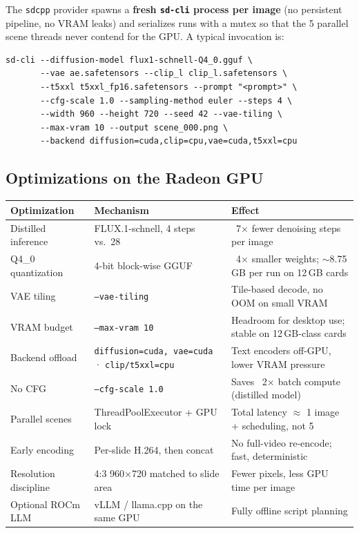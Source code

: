 \documentclass[UTF8,fontset=mac,a4paper,11pt]{ctexart}
\begin{document}
The \texttt{sdcpp} provider spawns a \textbf{fresh \texttt{sd-cli} process
per image} (no persistent pipeline, no VRAM leaks) and serializes runs with
a mutex so that the 5 parallel scene threads never contend for the GPU. A
typical invocation is:

\begin{lstlisting}
sd-cli --diffusion-model flux1-schnell-Q4_0.gguf \
       --vae ae.safetensors --clip_l clip_l.safetensors \
       --t5xxl t5xxl_fp16.safetensors --prompt "<prompt>" \
       --cfg-scale 1.0 --sampling-method euler --steps 4 \
       --width 960 --height 720 --seed 42 --vae-tiling \
       --max-vram 10 --output scene_000.png \
       --backend diffusion=cuda,clip=cpu,vae=cuda,t5xxl=cpu
\end{lstlisting}

\subsection{Optimizations on the Radeon GPU}

\begin{table}[h]
  \centering
  \begin{tabularx}{\textwidth}{@{}p{3.7cm}p{6.4cm}X@{}}
    \toprule
    \textbf{Optimization} & \textbf{Mechanism} & \textbf{Effect} \\
    \midrule
    Distilled inference & FLUX.1-schnell, 4 steps vs.\ 28
      & ~7× fewer denoising steps per image \\
    Q4\_0 quantization & 4-bit block-wise GGUF
      & ~4× smaller weights; $\sim$8.75\,GB per run on 12\,GB cards \\
    VAE tiling & \texttt{--vae-tiling}
      & Tile-based decode, no OOM on small VRAM \\
    VRAM budget & \texttt{--max-vram 10}
      & Headroom for desktop use; stable on 12\,GB-class cards \\
    Backend offload & \texttt{diffusion=cuda, vae=cuda} · \texttt{clip/t5xxl=cpu}
      & Text encoders off-GPU, lower VRAM pressure \\
    No CFG & \texttt{--cfg-scale 1.0}
      & Saves ~2× batch compute (distilled model) \\
    Parallel scenes & ThreadPoolExecutor + GPU lock
      & Total latency $\approx$ 1 image + scheduling, not 5 \\
    Early encoding & Per-slide H.264, then concat
      & No full-video re-encode; fast, deterministic \\
    Resolution discipline & 4:3 960×720 matched to slide area
      & Fewer pixels, less GPU time per image \\
    Optional ROCm LLM & vLLM / llama.cpp on the same GPU
      & Fully offline script planning \\
    \bottomrule
  \end{tabularx}
\end{table}
\end{document}
